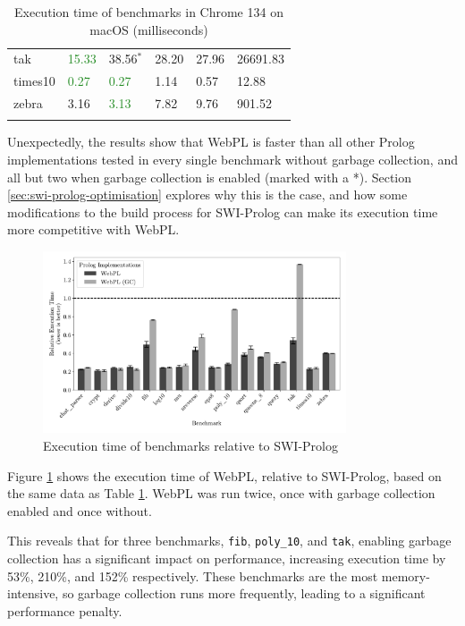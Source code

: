 \begin{table}[H]
\begin{tabular}{llllll}
tak          &  \textcolor{ForestGreen}{15.33}  &  38.56$^*$  &  28.20  &  27.96  & 26691.83  \\
times10      &   \textcolor{ForestGreen}{0.27}  &   \textcolor{ForestGreen}{0.27}  &   1.14  &   0.57  &    12.88  \\
zebra        &   3.16  &   \textcolor{ForestGreen}{3.13}  &   7.82  &   9.76  &   901.52  \\
\addlinespace\hline\addlinespace
\end{tabular}
\caption{Execution time of benchmarks in Chrome 134 on macOS (milliseconds)}
\label{tab:chrome-time}
\end{table}

\vspace*{-1.5em}

Unexpectedly, the results show that WebPL is faster than all other Prolog implementations tested in every single benchmark without garbage collection, and all but two when garbage collection is enabled (marked with a *). Section \ref{sec:swi-prolog-optimisation} explores why this is the case, and how some modifications to the build process for SWI-Prolog can make its execution time more competitive with WebPL.

\begin{figure}[H]
\centering
\includegraphics[width=0.8\textwidth]{relative_performance.pdf}
\caption{Execution time of benchmarks relative to SWI-Prolog}
\label{fig:relative-performance}
\end{figure}

Figure \ref{fig:relative-performance} shows the execution time of WebPL, relative to SWI-Prolog, based on the same data as Table \ref{tab:chrome-time}. WebPL was run twice, once with garbage collection enabled and once without.

This reveals that for three benchmarks, \texttt{fib}, \texttt{poly\_10}, and \texttt{tak}, enabling garbage collection has a significant impact on performance, increasing execution time by 53\%, 210\%, and 152\% respectively. These benchmarks are the most memory-intensive, so garbage collection runs more frequently, leading to a significant performance penalty.

